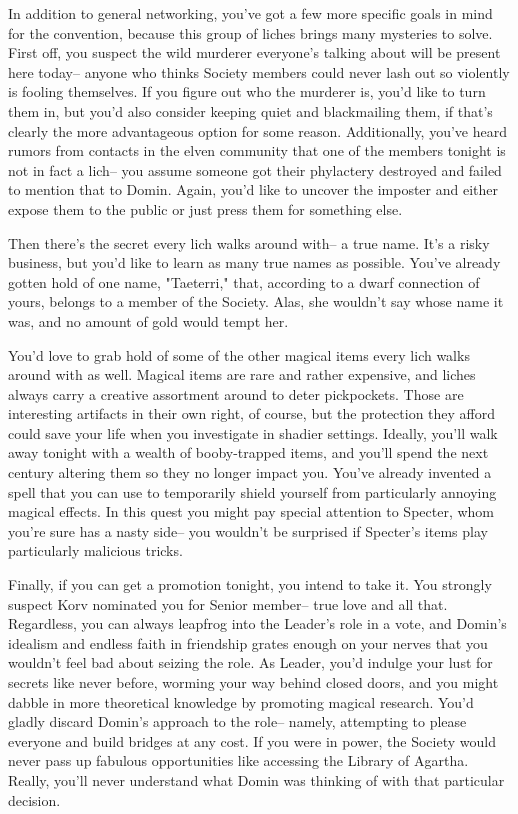 \documentclass[char]{Sel}
\begin{document}
In addition to general networking, you've got a few more specific goals in mind for the convention, because this group of liches brings many mysteries to solve. First off, you suspect the wild murderer everyone's talking about will be present here today-- anyone who thinks Society members could never lash out so violently is fooling themselves. If you figure out who the murderer is, you'd like to turn them in, but you'd also consider keeping quiet and blackmailing them, if that's clearly the more advantageous option for some reason. Additionally, you've heard rumors from contacts in the elven community that one of the members tonight is not in fact a lich-- you assume someone got their phylactery destroyed and failed to mention that to Domin. Again, you'd like to uncover the imposter and either expose them to the public or just press them for something else.

Then there's the secret every lich walks around with-- a true name. It's a risky business, but you'd like to learn as many true names as possible. You've already gotten hold of one name, "Taeterri," that, according to a dwarf connection of yours, belongs to a member of the Society. Alas, she wouldn't say whose name it was, and no amount of gold would tempt her.

You'd love to grab hold of some of the other magical items every lich walks around with as well. Magical items are rare and rather expensive, and liches always carry a creative assortment around to deter pickpockets. Those are interesting artifacts in their own right, of course, but the protection they afford could save your life when you investigate in shadier settings. Ideally, you'll walk away tonight with a wealth of booby-trapped items, and you'll spend the next century altering them so they no longer impact you. You've already invented a spell that you can use to temporarily shield yourself from particularly annoying magical effects. In this quest you might pay special attention to Specter, whom you're sure has a nasty side-- you wouldn't be surprised if Specter's items play particularly malicious tricks.

Finally, if you can get a promotion tonight, you intend to take it. You strongly suspect Korv nominated you for Senior member-- true love and all that. Regardless, you can always leapfrog into the Leader's role in a vote, and Domin's idealism and endless faith in friendship grates enough on your nerves that you wouldn't feel bad about seizing the role. As Leader, you'd indulge your lust for secrets like never before, worming your way behind closed doors, and you might dabble in more theoretical knowledge by promoting magical research. You'd gladly discard Domin's approach to the role-- namely, attempting to please everyone and build bridges at any cost. If you were in power, the Society would never pass up fabulous opportunities like accessing the Library of Agartha. Really, you'll never understand what Domin was thinking of with that particular decision.
\end{document}
